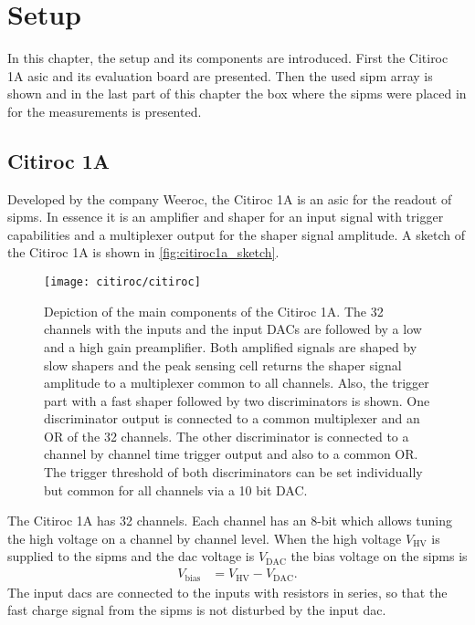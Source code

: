 \chapter{Setup}
In this chapter, the setup and its components are introduced. 
First the Citiroc 1A \ac{asic} and its evaluation board are presented. 
Then the used \ac{sipm} array is shown and in the last part of this chapter the box where the \ac{sipm}s were placed in for the measurements is presented.



\section{Citiroc 1A}
Developed by the company Weeroc, the Citiroc 1A is an \ac{asic} for the readout of \ac{sipm}s. 
In essence it is an amplifier and shaper for an input signal with trigger capabilities and a multiplexer output for the shaper signal amplitude.
A sketch of the Citiroc 1A is shown in \autoref{fig:citiroc1a_sketch}.
\begin{figure}
    \centering
    \texttt{[image: citiroc/citiroc]}
    \caption[Citiroc 1A sketch]{Depiction of the main components of the Citiroc 1A. 
	The 32 channels with the inputs and the input DACs are followed by a low and a high gain preamplifier. 
	Both amplified signals are shaped by slow shapers and the peak sensing cell returns the shaper signal amplitude to a multiplexer common to all channels. 
	Also, the trigger part with a fast shaper followed by two discriminators is shown. 
	One discriminator output is connected to a common multiplexer and an OR of the 32 channels. 
	The other discriminator is connected to a channel by channel time trigger output and also to a common OR. 
	The trigger threshold of both discriminators can be set individually but common for all channels via a 10 bit DAC. \cite{citiroc}}
    \label{fig:citiroc1a_sketch}
\end{figure}
The Citiroc 1A has 32 channels. 
Each channel has an 8-bit  which allows tuning the high voltage on a channel by channel level.
When the high voltage $V_\text{HV}$ is supplied to the \ac{sipm}s and the \ac{dac} voltage is $V_\text{DAC}$ the bias voltage on the \ac{sipm}s is
\begin{align}
	V_\text{bias} &= V_\text{HV} - V_\text{DAC}.
\end{align}
The input \ac{dac}s are connected to the inputs with resistors in series, so that the fast charge signal from the \ac{sipm}s is not disturbed by the input \ac{dac}.
